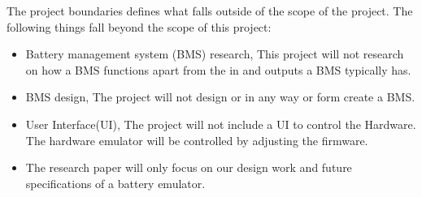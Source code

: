 \IEEEPARstart
{T}{he} project boundaries defines what falls outside of the scope of the project. The following
things fall beyond the scope of this project:
\begin{itemize}
    \item Battery management system (BMS) research, This project will not research on how a BMS
    functions apart from the in and outputs a BMS typically has.
    \item BMS design, The project will not design or in any way or form create a BMS.
    \item User Interface(UI), The project will not include a UI to control the Hardware. 
    The hardware emulator will be controlled by adjusting the firmware.
    \item The research paper will only focus on our design work and future 
    specifications of a battery emulator.
\end{itemize}
